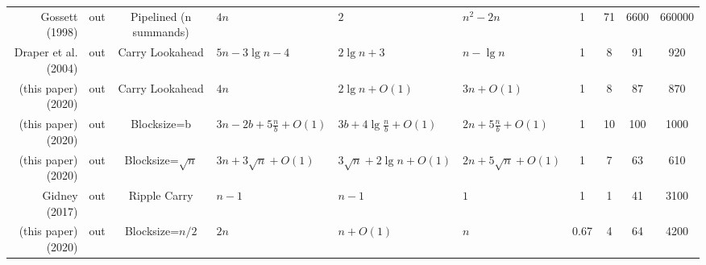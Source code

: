 \begin{tabular}{r|c|c|l|l|l|c|c|c|c}
\hline
Gossett (1998) \cite{gossett1998carrysave}           &out   &Pipelined (n summands) &$4n$                             &$2$                            &$n^2 - 2n$                 &1    &71            &6600            &660000            \\
Draper et al. (2004) \cite{draper2004lookaheadadder} &out   &Carry Lookahead        &$5n - 3\lg n - 4$                &$2\lg n + 3$                   &$n - \lg n$                &1    &8             &91              &920               \\
(this paper) (2020)                                  &out   &Carry Lookahead        &$4n$                             &$2\lg n + O(1)$                &$3n + O(1)$                &1    &8             &87              &870               \\
(this paper) (2020)                                  &out   &Blocksize=b            &$3n - 2b + 5\frac{n}{b} + O(1)$  &$3b + 4\lg \frac{n}{b} + O(1)$ &$2n + 5\frac{n}{b} + O(1)$ &1    &10            &100             &1000              \\
(this paper) (2020)                                  &out   &Blocksize=$\sqrt{n}$   &$3n + 3\sqrt n + O(1)$           &$3\sqrt n + 2\lg n + O(1)$     &$2n + 5\sqrt n + O(1)$     &1    &7             &63              &610               \\
Gidney (2017) \cite{gidney2018halving}               &out   &Ripple Carry           &$n - 1$                          &$n - 1$                        &$1$                        &1    &1             &41              &3100              \\
(this paper) (2020)                                  &out   &Blocksize=$n/2$        &$2n$                             &$n + O(1)$                     &$n$                        &0.67 &4             &64              &4200              \\
\end{tabular}
